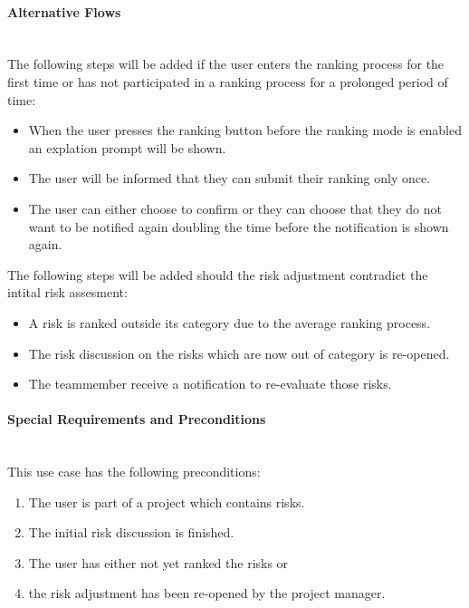 \paragraph*{Alternative Flows}\mbox{}\\

	The following steps will be added if the user enters the ranking process for the first time or has not participated in a ranking process for a prolonged period of time:
\begin{itemize}
	\vspace{-3mm}
	\setlength\itemsep{-1em}
	\item When the user presses the ranking button before the ranking mode is enabled an explation prompt will be shown.
	\item The user will be informed that they can submit their ranking only once.
	\item The user can either choose to confirm or they can choose that they do not want to be notified again doubling the time before the notification is shown again.
\end{itemize}
	
	The following steps will be added should the risk adjustment contradict the intital risk assesment:
\begin{itemize}
	\vspace{-3mm}
	\setlength\itemsep{-1em}
	\item A risk is ranked outside its category due to the average ranking process.
	\item The risk discussion on the risks which are now out of category is re-opened.
	\item The teammember receive a notification to re-evaluate those risks.
\end{itemize}


\paragraph*{Special Requirements and Preconditions}\mbox{}\\
This use case has the following preconditions:
\begin{enumerate}
	\vspace{-3mm}
	\setlength\itemsep{-1em}
	\item The user is part of a project which contains risks.
	\item The initial risk discussion is finished.
	\item The user has either not yet ranked the risks or 
	\item the risk adjustment has been re-opened by the project manager.
\end{enumerate}


